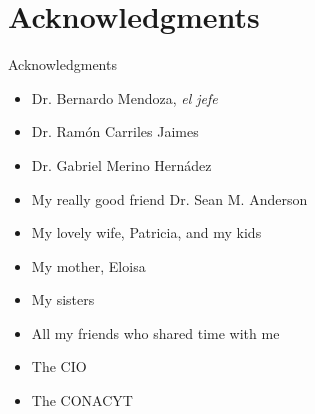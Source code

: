 \documentclass{beamer}
\begin{document}
\section{Acknowledgments} 



\begin{frame}

\begin{center}
    
{\Large Acknowledgments}

\begin{itemize}
\item Dr.   Bernardo Mendoza, \emph{el jefe}
\item Dr. Ram\'on Carriles Jaimes
\item Dr. Gabriel Merino Hern\'adez
\item My really good friend Dr. Sean M. Anderson
\item My lovely wife, Patricia, and my kids 
\item My mother, Eloisa
\item My sisters
\item All my friends who shared time with me
\item The CIO
\item The CONACYT
\end{itemize}

\end{center}

\end{frame}


{
\begin{frame}
\end{frame}
}
\end{document}
